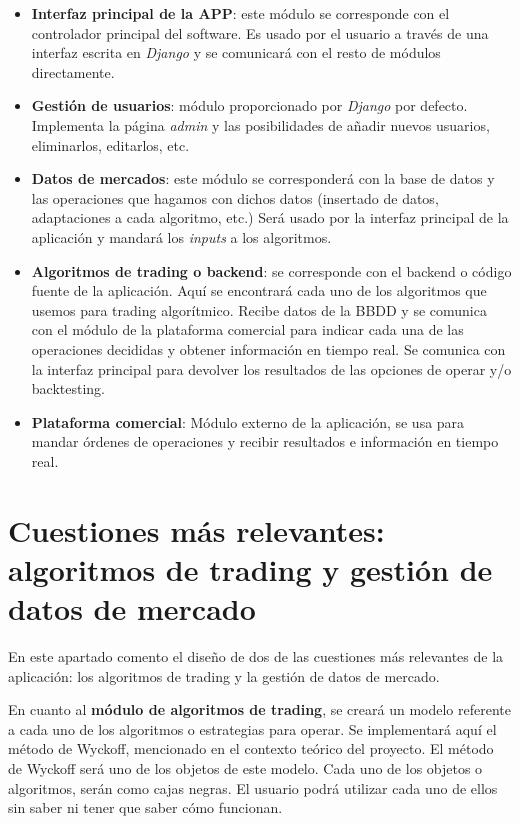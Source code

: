 \begin{itemize}
	\item \textbf{Interfaz principal de la APP}: este módulo se corresponde con el controlador principal del software. Es usado por el usuario a través de una interfaz escrita en \textit{Django} y se comunicará con el resto de módulos directamente.
	\item \textbf{Gestión de usuarios}: módulo proporcionado por \textit{Django} por defecto. Implementa la página \textit{admin} y las posibilidades de añadir nuevos usuarios, eliminarlos, editarlos, etc. 
	\item \textbf{Datos de mercados}: este módulo se corresponderá con la base de datos y las operaciones que hagamos con dichos datos (insertado de datos, adaptaciones a cada algoritmo, etc.) Será usado por la interfaz principal de la aplicación y mandará los \textit{inputs} a los algoritmos.
	\item \textbf{Algoritmos de trading o backend}: se corresponde con el backend o código fuente de la aplicación. Aquí se encontrará cada uno de los algoritmos que usemos para trading algorítmico. Recibe datos de la BBDD y se comunica con el módulo de la plataforma comercial para indicar cada una de las operaciones decididas y obtener información en tiempo real. Se comunica con la interfaz principal para devolver los resultados de las opciones de operar y/o backtesting.
	\item \textbf{Plataforma comercial}: Módulo externo de la aplicación, se usa para mandar órdenes de operaciones y recibir resultados e información en tiempo real.
\end{itemize}

\section{Cuestiones más relevantes: algoritmos de trading y gestión de datos de mercado}

En este apartado comento el diseño de dos de las cuestiones más relevantes de la aplicación: los algoritmos de trading y la gestión de datos de mercado.\newline

En cuanto al \textbf{módulo de algoritmos de trading}, se creará un modelo referente a cada uno de los algoritmos o estrategias para operar. Se implementará aquí el método de Wyckoff, mencionado en el contexto teórico del proyecto. El método de Wyckoff será uno de los objetos de este modelo. Cada uno de los objetos o algoritmos, serán como cajas negras. El usuario podrá utilizar cada uno de ellos sin saber ni tener que saber cómo funcionan.\newline

